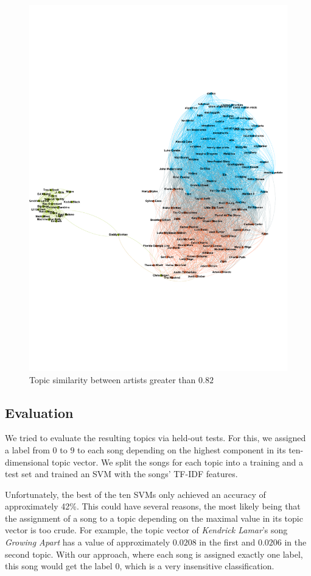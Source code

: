 \documentclass[10pt,a4paper]{article}
\begin{document}
		\begin{figure}[htb]
			\centering
			\includegraphics[trim=0mm 70mm 0mm 70mm, clip, width=\linewidth]{data/topic_similarity}
				\caption{Topic similarity between artists greater than $0.82$}
				\label{fig:topicsimilarity}
		\end{figure}
		
		\subsection{Evaluation}
		We tried to evaluate the resulting topics via held-out tests. For this, we assigned a label from $0$ to $9$ to each song depending on the highest component in its ten-dimensional topic vector. We split the songs for each topic into a training and a test set and trained an SVM with the songs' TF-IDF features.
		
		Unfortunately, the best of the ten SVMs only achieved an accuracy of approximately 42\%. This could have several reasons, the most likely being that the assignment of a song to a topic depending on the maximal value in its topic vector is too crude. For example, the topic vector of \textit{Kendrick Lamar}'s song \textit{Growing Apart} has a value of approximately $0.0208$ in the first and $0.0206$ in the second topic. With our approach, where each song is assigned exactly one label, this song would get the label $0$, which is a very insensitive classification.
		
\end{document}
